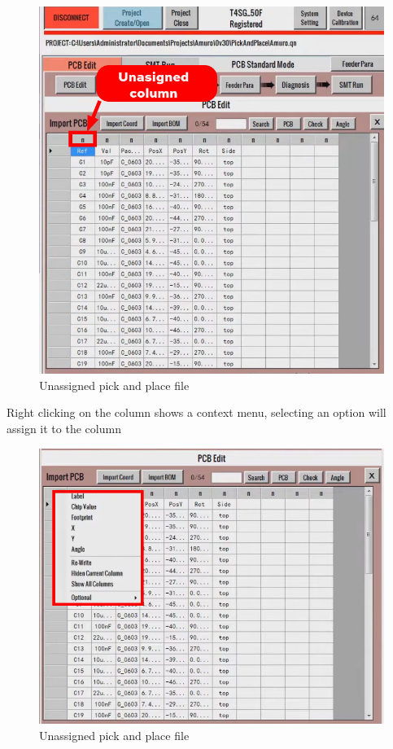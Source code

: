 \documentclass[a4paper,10pt]{report}
\begin{document}
\begin{figure}[!htb]
 \centering
 \includegraphics[width=1\textwidth]{images/scrot4_1.png}
 \caption{Unassigned pick and place file}
\end{figure}
Right clicking on the column shows a context menu, selecting an option will assign it to the column
\begin{figure}[!htb]
 \centering
 \includegraphics[width=1\textwidth]{images/scrot4_2.png}
 \caption{Unassigned pick and place file}
\end{figure}
\end{document}
